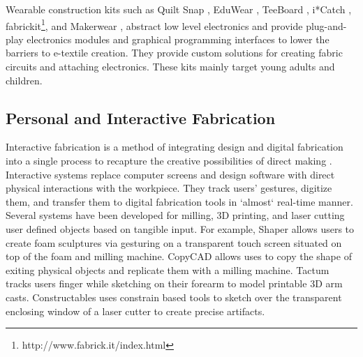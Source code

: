Wearable construction kits such as Quilt Snap \cite{buechley2005quilt}, EduWear \cite{katterfeldt2009eduwear}, TeeBoard \cite{ngai2009teeboard}, i*Catch \cite{ngai2010catch}, fabrickit\footnote{http://www.fabrick.it/index.html}, and Makerwear \cite{kazemitabaar2017makerwear}, abstract low level electronics and provide plug-and-play electronics modules and graphical programming interfaces to lower the barriers to e-textile creation. They provide custom solutions for creating fabric circuits and attaching electronics. These kits mainly target young adults and children. 













\subsection{Personal and Interactive Fabrication}
Interactive fabrication is a method of integrating design and digital fabrication into a single process to recapture the creative possibilities of direct making \cite{willis2011interactive}. Interactive systems replace computer screens and design software with direct physical interactions with the workpiece. They track users' gestures, digitize them, and transfer them to digital fabrication tools in `almost` real-time manner. Several systems have been developed for milling, 3D printing, and laser cutting user defined objects based on tangible input. For example, Shaper \cite{willis2011interactive} allows users to create foam sculptures via gesturing on a transparent touch screen situated on top of the foam and milling machine. CopyCAD \cite{follmer2010copycad} allows uses to copy the shape of exiting physical objects and replicate them with a milling machine. Tactum \cite{gannon2015tactum} tracks users finger while sketching on their forearm to model printable 3D arm casts. Constructables \cite{mueller2012interactive} uses constrain based tools to sketch over the transparent enclosing window of a laser cutter to create precise artifacts.


